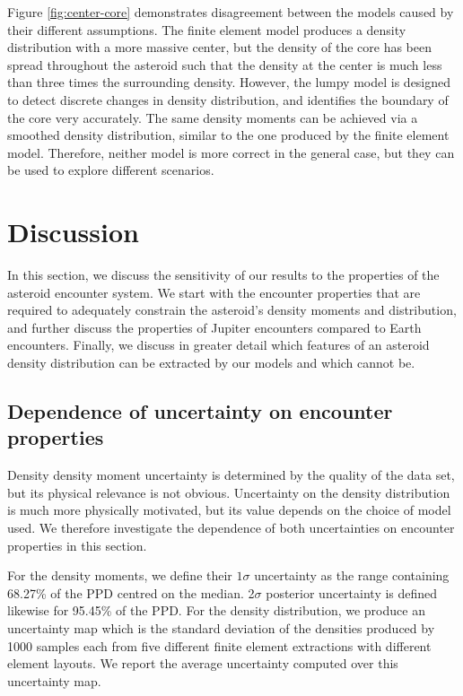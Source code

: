 \documentclass[fleqn,usenatbib]{mnras}
\begin{document}
Figure \ref{fig:center-core} demonstrates disagreement between the models caused by their different assumptions. The finite element model produces a density distribution with a more massive center, but the density of the core has been spread throughout the asteroid such that the density at the center is much less than three times the surrounding density. However, the lumpy model is designed to detect discrete changes in density distribution, and identifies the boundary of the core very accurately. The same density moments can be achieved via a smoothed density distribution, similar to the one produced by the finite element model. Therefore, neither model is more correct in the general case, but they can be used to explore different scenarios.




\section{Discussion}
\label{sec:discussion}

In this section, we discuss the sensitivity of our results to the properties of the asteroid encounter system. We start with the encounter properties that are required to adequately constrain the asteroid's density moments and distribution, and further discuss the properties of Jupiter encounters compared to Earth encounters. Finally, we discuss in greater detail which features of an asteroid density distribution can be extracted by our models and which cannot be.

\subsection{Dependence of uncertainty on encounter properties}
\label{sec:fit-uncertainty}

Density density moment uncertainty is determined by the quality of the data set, but its physical relevance is not obvious. Uncertainty on the density distribution is much more physically motivated, but its value depends on the choice of model used. We therefore investigate the dependence of both uncertainties on encounter properties in this section.

For the density moments, we define their $1\sigma$ uncertainty as the range containing 68.27\% of the PPD centred on the median. 2$\sigma$ posterior uncertainty is defined likewise for 95.45\% of the PPD. For the density distribution, we produce an uncertainty map which is the standard deviation of the densities produced by 1000 samples each from five different finite element extractions with different element layouts. We report the average uncertainty computed over this uncertainty map.
\end{document}
